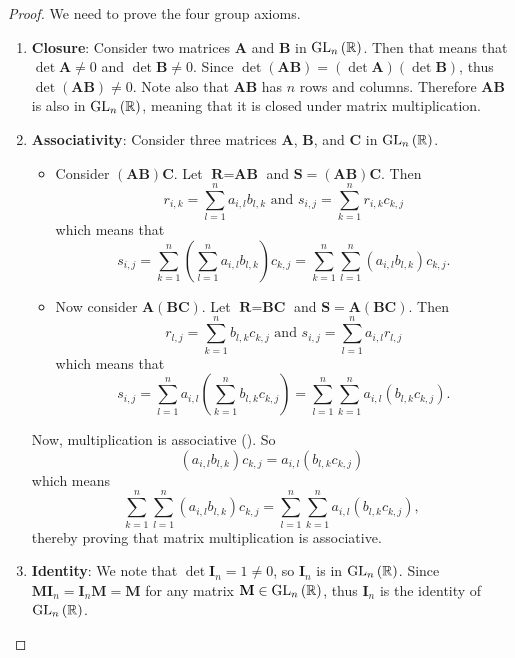 \begin{proof}
    We need to prove the four group axioms.
    \begin{enumerate}
        \item \textbf{Closure}: Consider two matrices \textbf{A} and \textbf{B} in $\mathrm{GL}_{n}\left(\mathbb{R}\right)$. Then that means that $\det \textbf{A} \neq 0$ and $\det \textbf{B} \neq 0$. Since $\det(\textbf{AB}) = (\det \textbf{A})(\det \textbf{B})$, thus $\det(\textbf{AB}) \neq 0$. Note also that $\textbf{AB}$ has $n$ rows and columns. Therefore $\textbf{AB}$ is also in $\mathrm{GL}_{n}\left(\mathbb{R}\right)$, meaning that it is closed under matrix multiplication.
        
        \item \textbf{Associativity}: Consider three matrices \textbf{A}, \textbf{B}, and \textbf{C} in $\mathrm{GL}_{n}\left(\mathbb{R}\right)$.
        \begin{itemize}
            \item Consider $(\textbf{AB})\textbf{C}$. Let $\textbf{R} = \textbf{AB}$ and $\textbf{S} = (\textbf{AB})\textbf{C}$. Then
            \[
                r_{i,k} = \sum_{l=1}^n a_{i,l}b_{l,k} \text{ and } s_{i,j} = \sum_{k=1}^n r_{i,k}c_{k,j}
            \]
            which means that
            \[
                s_{i,j} = \sum_{k=1}^n \left(\sum_{l=1}^n a_{i,l}b_{l,k}\right)c_{k,j} = \sum_{k=1}^n \sum_{l=1}^n (a_{i,l}b_{l,k})c_{k,j}.
            \]
            \item Now consider $\textbf{A}(\textbf{BC})$. Let $\textbf{R} = \textbf{BC}$ and $\textbf{S} = \textbf{A}(\textbf{BC})$. Then
            \[
                r_{l,j} = \sum_{k=1}^nb_{l,k}c_{k,j} \text{ and } s_{i,j} = \sum_{l=1}^n a_{i,l}r_{l,j}
            \]
            which means that
            \[
                s_{i,j} = \sum_{l=1}^n a_{i,l}\left(\sum_{k=1}^nb_{l,k}c_{k,j}\right) = \sum_{l=1}^n\sum_{k=1}^n a_{i,l}(b_{l,k}c_{k,j}).
            \]
        \end{itemize}
        Now, multiplication is associative (). So
        \[
                (a_{i,l}b_{l,k})c_{k,j} = a_{i,l}(b_{l,k}c_{k,j})
        \]
        which means
        \[
            \sum_{k=1}^n \sum_{l=1}^n (a_{i,l}b_{l,k})c_{k,j} = \sum_{l=1}^n\sum_{k=1}^n a_{i,l}(b_{l,k}c_{k,j}),
        \]
        thereby proving that matrix multiplication is associative.
        
        \item \textbf{Identity}: We note that $\det \textbf{I}_n = 1 \neq 0$, so $\textbf{I}_n$ is in $\mathrm{GL}_{n}\left(\mathbb{R}\right)$. Since $\textbf{MI}_n = \textbf{I}_n\textbf{M} = \textbf{M}$ for any matrix $\textbf{M} \in \mathrm{GL}_{n}\left(\mathbb{R}\right)$, thus $\textbf{I}_n$ is the identity of $\mathrm{GL}_{n}\left(\mathbb{R}\right)$.
        

\end{enumerate}
\end{proof}
